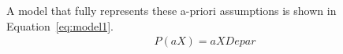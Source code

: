 A model that fully represents these a-priori assumptions is shown in Equation~\ref{eq:model1}.
\begin{align}
    P(aX) = aXDepar
\end{align}
